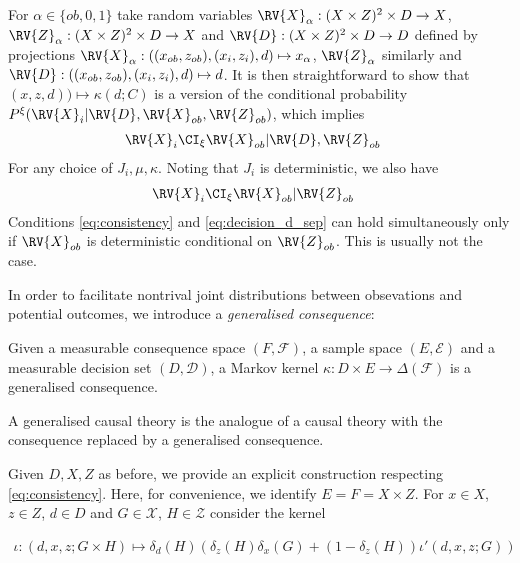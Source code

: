 For $\alpha\in\{ob,0,1\}$ take random variables $\RV{X}_\alpha:(X\times Z)^2\times D\to X$, $\RV{Z}_\alpha:(X\times Z)^2\times D\to X$ and $\RV{D}:(X\times Z)^2\times D\to D$ defined by projections $\RV{X}_\alpha:((x_{ob},z_{ob}),(x_i,z_i),d)\mapsto x_\alpha$, $\RV{Z}_\alpha$ similarly and $\RV{D}:((x_{ob},z_{ob}),(x_i,z_i),d)\mapsto d$. It is then straightforward to show that $(x,z,d))\mapsto \kappa(d; C)$ is a version of the conditional probability $P^\xi(\RV{X}_i|\RV{D},\RV{X}_{ob},\RV{Z}_{ob})$, which implies 
\begin{align}
    \RV{X}_i&\CI_\xi \RV{X}_{ob}|\RV{D}, \RV{Z}_{ob}
\end{align}
For any choice of $J_i,\mu,\kappa$. Noting that $J_i$ is deterministic, we also have
\begin{align}
    \RV{X}_i&\CI_\xi \RV{X}_{ob}|\RV{Z}_{ob} \label{eq:decision_d_sep}
\end{align}
Conditions \ref{eq:consistency} and \ref{eq:decision_d_sep} can hold simultaneously only if $\RV{X}_{ob}$ is deterministic conditional on $\RV{Z}_{ob}$. This is usually not the case.



In order to facilitate nontrival joint distributions between obsevations and potential outcomes, we introduce a \emph{generalised consequence}:

\begin{definition}
Given a measurable consequence space $(F,\mathcal{F})$, a sample space $(E,\mathcal{E})$ and a measurable decision set $(D,\mathcal{D})$, a Markov kernel $\kappa:D\times E \to \Delta(\mathcal{F})$ is a generalised consequence.
\end{definition}

\begin{definition}
A generalised causal theory is the analogue of a causal theory with the consequence replaced by a generalised consequence.
\end{definition}

Given $D,X,Z$ as before, we provide an explicit construction respecting \ref{eq:consistency}. Here, for convenience, we identify $E=F=X\times Z$. For $x\in X$, $z\in Z$, $d\in D$ and $G\in \mathcal{X}$, $H\in \mathcal{Z}$ consider the kernel

\begin{align}
    \iota: (d,x,z;G\times H) \mapsto \delta_d(H)(\delta_z(H) \delta_x(G) + (1-\delta_z(H)) \iota'(d,x,z;G))
\end{align}

